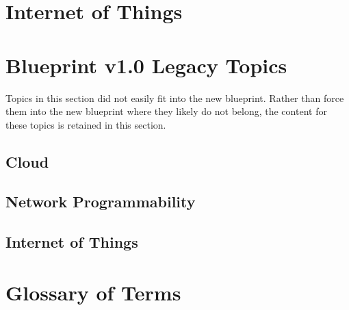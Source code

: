 \documentclass{article}
\begin{document}
\newpage
\section{Internet of Things}
\renewcommand{\imgpath}{content/iot/a3a-archdeploy/img/}






\newpage
\section{Blueprint v1.0 Legacy Topics}
Topics in this section did not easily fit into the new blueprint. Rather than
force them into the new blueprint where they likely do not belong, the content
for these topics is retained in this section.
\renewcommand{\imgpath}{content/legacy/img/}
\subsection{Cloud}



\subsection{Network Programmability}



\subsection{Internet of Things}


\newpage
\section{Glossary of Terms}

\end{document}
